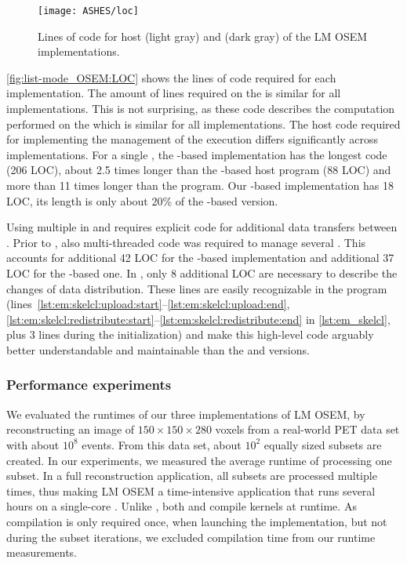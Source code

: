 \begin{figure}
  \centering
  \texttt{[image: ASHES/loc]}
  \caption{Lines of code for host (light gray) and \GPU (dark gray) of the LM OSEM implementations.}
  \label{fig:list-mode_OSEM:LOC}
\end{figure}

\autoref{fig:list-mode_OSEM:LOC} shows the lines of code required for each implementation.
The amount of lines required on the \GPU is similar for all implementations.
This is not surprising, as these code describes the computation performed on the \GPU which is similar for all implementations.
The host code required for implementing the management of the \GPU execution differs significantly across implementations.
For a single \GPU, the \OpenCL-based implementation has the longest code (206 LOC), \ie about 2.5 times longer than the \CUDA-based host program (88 LOC) and more than 11 times longer than the \SkelCL program.
Our \SkelCL-based implementation has 18 LOC, \ie its length is only about 20\% of the \CUDA-based version.

Using multiple \GPUs in \OpenCL and \CUDA requires explicit code for additional data transfers between \GPUs.
Prior to , also multi-threaded code was required to manage several \GPUs.
This accounts for additional 42 LOC for the \CUDA-based implementation and additional 37 LOC for the \OpenCL-based one.
In \SkelCL, only 8 additional LOC are necessary to describe the changes of data distribution.
These lines are easily recognizable in the \SkelCL program (lines~\ref{lst:em:skelcl:upload:start}--\ref{lst:em:skelcl:upload:end}, \ref{lst:em:skelcl:redistribute:start}--\ref{lst:em:skelcl:redistribute:end} in \autoref{lst:em_skelcl}, plus 3 lines during the initialization) and make this high-level code arguably better understandable and maintainable than the \CUDA and \OpenCL versions.













\subsubsection*{Performance experiments}
We evaluated the runtimes of our three implementations of LM OSEM, by reconstructing an image of $150\times 150\times 280$ voxels from a real-world PET data set with about $10^8$ events.
From this data set, about $10^2$ equally sized subsets are created.
In our experiments, we measured the average runtime of processing one subset.
In a full reconstruction application, all subsets are processed multiple times, thus making LM OSEM a time-intensive application that runs several hours on a single-core \CPU.
Unlike \CUDA, both \OpenCL and \SkelCL compile kernels at runtime.
As compilation is only required once, when launching the implementation, but not during the subset iterations, we excluded compilation time from our runtime measurements.

